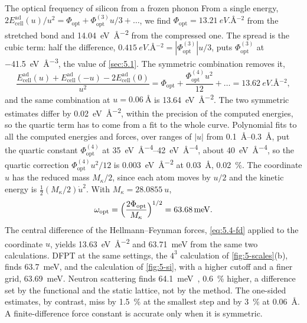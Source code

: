 \begin{workedexample}{The optical frequency of silicon from a frozen phonon}
From a single energy, $2E^{\mathrm{ad}}_{\mathrm{cell}}(u)/u^2 = \Phi_{\mathrm{opt}} + \Phi^{(3)}_{\mathrm{opt}}u/3 + \dots$, we find $\Phi_{\mathrm{opt}} = \SI{13.21}{eV.\angstrom^{-2}}$ from the stretched bond and \SI{14.04}{eV.\angstrom^{-2}} from the compressed one. The spread is the cubic term: half the difference, $\SI{0.415}{eV.\angstrom^{-2}} = |\Phi^{(3)}_{\mathrm{opt}}|u/3$, puts $\Phi^{(3)}_{\mathrm{opt}}$ at \SI{-41.5}{eV.\angstrom^{-3}}, the value of \cref{sec:5.1}. The symmetric combination removes it,
\begin{equation*}
  \frac{E^{\mathrm{ad}}_{\mathrm{cell}}(u) + E^{\mathrm{ad}}_{\mathrm{cell}}(-u) - 2E^{\mathrm{ad}}_{\mathrm{cell}}(0)}{u^2} = \Phi_{\mathrm{opt}} + \frac{\Phi^{(4)}_{\mathrm{opt}}u^2}{12} + \dots = \SI{13.62}{eV.\angstrom^{-2}} ,
\end{equation*}
and the same combination at $u = \SI{0.06}{\angstrom}$ is \SI{13.64}{eV.\angstrom^{-2}}. The two symmetric estimates differ by \SI{0.02}{eV.\angstrom^{-2}}, within the precision of the computed energies, so the quartic term has to come from a fit to the whole curve. Polynomial fits to all the computed energies and forces, over ranges of $|u|$ from \SIrange{0.1}{0.3}{\angstrom}, put the quartic constant $\Phi^{(4)}_{\mathrm{opt}}$ at \SIrange{35}{42}{eV.\angstrom^{-4}}, about \SI{40}{eV.\angstrom^{-4}}, so the quartic correction $\Phi^{(4)}_{\mathrm{opt}}u^2/12$ is \SI{0.003}{eV.\angstrom^{-2}} at \SI{0.03}{\angstrom}, \SI{0.02}{\percent}. The coordinate $u$ has the reduced mass $M_\kappa/2$, since each atom moves by $u/2$ and the kinetic energy is $\tfrac12(M_\kappa/2)\dot u^2$. With $M_\kappa = \SI{28.0855}{u}$,
\begin{equation*}
  \omega_{\mathrm{opt}} = \Bigl(\frac{2\Phi_{\mathrm{opt}}}{M_\kappa}\Bigr)^{1/2} = \SI{63.68}{meV} .
\end{equation*}
The central difference of the Hellmann--Feynman forces, \cref{eq:5.4-fd} applied to the coordinate $u$, yields \SI{13.63}{eV.\angstrom^{-2}} and \SI{63.71}{meV} from the same two calculations. DFPT at the same settings, the $4^3$ calculation of \cref{fig:5-scales}(b), finds \SI{63.7}{meV}, and the calculation of \cref{fig:5-si}, with a higher cutoff and a finer grid, \SI{63.69}{meV}. Neutron scattering finds \SI{64.1}{meV}~\cite{nilsson1972study}, \SI{0.6}{\percent} higher, a difference set by the functional and the static lattice, not by the method. The one-sided estimates, by contrast, miss by \SI{1.5}{\percent} at the smallest step and by \SI{3}{\percent} at \SI{0.06}{\angstrom}. A finite-difference force constant is accurate only when it is symmetric.
\end{workedexample}

